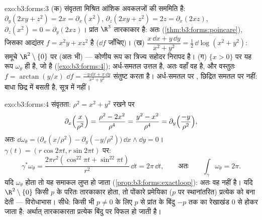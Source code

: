 \begin{solution}{exo:b3:forms:3}
(क) संवृतता मिश्रित आंशिक अवकलजों की सममिति है:
$\partial_y(2xy + z^2) = 2x = \partial_x(x^2)$,
$\partial_z(2xy + z^2) = 2z = \partial_x(2xz)$,
$\partial_z(x^2) = 0 = \partial_y(2xz)$। प्रांत $\R^3$
तारकाकार है: अतः  (\cref{thm:b3:forms:poincare}),
जिसका आद्यंतर $f = x^2y + xz^2$ है ($\dd f$ जाँचिए)।
(ख) $\dfrac{x\,\dd x + y\,\dd y}{x^2 + y^2} =
\tfrac12\,\dd\log(x^2 + y^2)$: समूचे
$\R^2\setminus\{0\}$ पर  (अतः  भी) --- कोणीय रूप
का त्रिज्य सहोदर निरापद है।
(ग) $\{x > 0\}$ पर यह रूप $\omega_\theta$ ही है, जो  है
(\cref{exo:b3:forms:4}); अर्ध-समतल उत्तल है, अतः वहाँ वह
 है, और वस्तुतः $f = \arctan(y/x)$ $\dd f
= \frac{-y\,\dd x + x\,\dd y}{x^2 + y^2}$ संतुष्ट करता है।
अर्ध-समतल पर , छिद्रित समतल पर नहीं: बाधा छिद्र में
बसती है, सूत्र में नहीं।
\end{solution}

\begin{solution}{exo:b3:forms:4}
संवृतता: $\rho^2 = x^2 + y^2$ रखने पर
\[
\partial_x\Bigl(\frac{x}{\rho^2}\Bigr) = \frac{\rho^2 -
2x^2}{\rho^4} = \frac{y^2 - x^2}{\rho^4} =
\partial_y\Bigl(\frac{-y}{\rho^2}\Bigr),
\]
अतः $\dd\omega_\theta = \bigl(\partial_x(x/\rho^2) -
\partial_y(-y/\rho^2)\bigr)\,\dd x\wedge\dd y = 0$।
$\gamma(t) = (r\cos2\pi t, r\sin2\pi t)$ पर:
\[
\gamma^*\omega_\theta = \frac{2\pi r^2(\cos^22\pi t +
\sin^22\pi t)}{r^2}\,\dd t = 2\pi\,\dd t,
\qquad\text{अतः}\qquad
\int_\gamma\omega_\theta = 2\pi .
\] यदि $\omega_\theta$  होता तो यह समाकल लुप्त हो जाता
(\cref{prop:b3:forms:exactloop}): अतः वह  नहीं है। यदि
$\R^2\setminus\{0\}$ किसी $p$ के परितः तारकाकार होता, तो
पोंकारे प्रमेयिका ($p$ पर स्थानांतरित) प्रत्येक  को
 बना देती --- विरोधाभास। सीधे: किसी भी $p
\neq 0$ के लिए $p$ से प्रांत के बिंदु $-p$ तक का रेखाखंड $0$
से होकर जाता है: अर्थात् तारकाकारता प्रत्येक बिंदु पर विफल
हो जाती है।
\end{solution}

